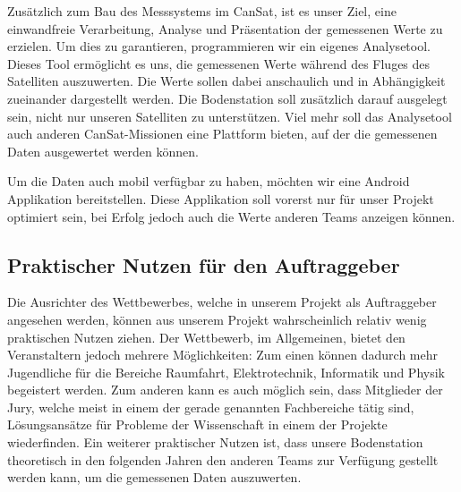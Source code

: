 Zusätzlich zum Bau des Messsystems im CanSat, ist es unser Ziel, eine einwandfreie Verarbeitung, Analyse und Präsentation der gemessenen Werte zu erzielen. Um dies zu garantieren, programmieren wir ein eigenes Analysetool. Dieses Tool ermöglicht es uns, die gemessenen Werte während des Fluges des Satelliten auszuwerten. Die Werte sollen dabei anschaulich und in Abhängigkeit zueinander dargestellt werden. Die Bodenstation soll zusätzlich darauf ausgelegt sein, nicht nur unseren Satelliten zu unterstützen. Viel mehr soll das Analysetool auch anderen CanSat-Missionen eine Plattform bieten, auf der die gemessenen Daten ausgewertet werden können.

Um die Daten auch mobil verfügbar zu haben, möchten wir eine Android Applikation bereitstellen. Diese Applikation soll vorerst nur für unser Projekt optimiert sein, bei Erfolg jedoch auch die Werte anderen Teams anzeigen können.

\subsection{Praktischer Nutzen für den Auftraggeber}
Die Ausrichter des Wettbewerbes, welche in unserem Projekt als Auftraggeber angesehen werden, können aus unserem Projekt wahrscheinlich relativ wenig praktischen Nutzen ziehen. Der Wettbewerb, im Allgemeinen, bietet den Veranstaltern jedoch mehrere Möglichkeiten: Zum einen können dadurch mehr Jugendliche für die Bereiche Raumfahrt, Elektrotechnik, Informatik und Physik begeistert werden. Zum anderen kann es auch möglich sein, dass Mitglieder der Jury, welche meist in einem der gerade genannten Fachbereiche tätig sind, Lösungsansätze für Probleme der Wissenschaft in einem der Projekte wiederfinden. Ein weiterer praktischer Nutzen ist, dass unsere Bodenstation theoretisch in den folgenden Jahren den anderen Teams zur Verfügung gestellt werden kann, um die gemessenen Daten auszuwerten.

